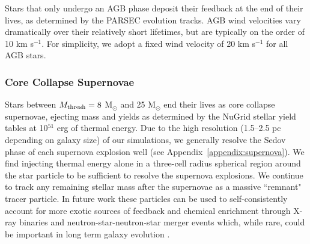 \documentclass[twocolumn]{aastex61}
\begin{document}

Stars that only undergo an AGB phase deposit their feedback at the end of their lives, as determined by the PARSEC evolution tracks. AGB wind velocities vary dramatically over their relatively short lifetimes, but are typically on the order of 10 km s$^{-1}$. For simplicity, we adopt a fixed wind velocity of 20 km s$^{-1}$ for all AGB stars.

\subsubsection{Core Collapse Supernovae}
\label{sec: core collapse}
Stars between  $M_{\rm thresh} = 8$ M$_{\odot}$ and 25 M$_{\odot}$ end their lives as core collapse supernovae, ejecting mass and yields as determined by the NuGrid stellar yield tables at 10$^{51}$ erg of thermal energy. Due to the high resolution (1.5--2.5 pc depending on galaxy size) of our simulations, we generally resolve the Sedov phase of each supernova explosion well (see Appendix~\ref{appendix:supernova}). We find injecting thermal energy alone in a three-cell radius spherical region around the star particle to be sufficient to resolve the supernova explosions. We continue to track any remaining stellar mass after the supernovae as a massive ``remnant" tracer particle. In future work these particles can be used to self-consistently account for more exotic sources of feedback and chemical enrichment through X-ray binaries and neutron-star-neutron-star merger events which, while rare, could be important in long term galaxy evolution \citep[e.x.][]{Artale2015}.
\end{document}
